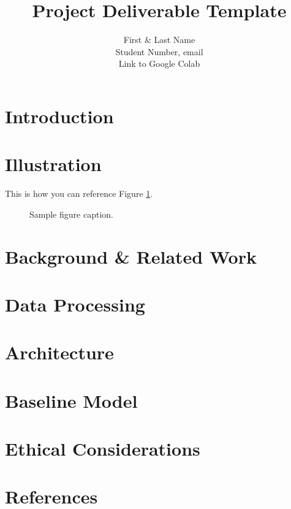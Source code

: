 \documentclass[final]{article}
\title{Project Deliverable Template}
\author{%
  First \& Last Name \\
  Student Number, email\\
  Link to Google Colab\\
}
\begin{document}
\maketitle

\vspace{-0.5in}

\section*{Introduction}

\section*{Illustration}
This is how you can reference Figure \ref{fig:sample}.

\begin{figure}[!h]
  \centering
  \fbox{\rule[-.5cm]{0cm}{4cm} \rule[-.5cm]{4cm}{0cm}}
  \caption{Sample figure caption.}
  \label{fig:sample}
\end{figure}

\section*{Background \& Related Work}

\section*{Data Processing}

\section*{Architecture}

\section*{Baseline Model}

\section*{Ethical Considerations}

\newpage
\section*{References}
\end{document}
